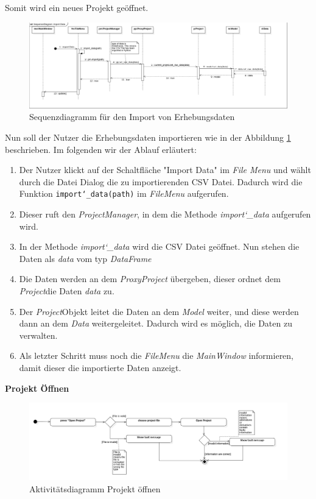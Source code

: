 \documentclass{article}
\begin{document}
Somit wird ein neues Projekt geöffnet.
\begin{figure}[H]%
    \includegraphics[width=15cm]{entwurf/Entwurf_dokument/img/Alissa/SQImportDataFinal.png}
    \caption{Sequenzdiagramm für den Import von Erhebungsdaten}
    \label{fig:sq:importData}
\end{figure}
Nun soll der Nutzer die Erhebungsdaten importieren wie in der Abbildung \ref{fig:sq:importData} beschrieben. Im folgenden wir der Ablauf erläutert:
\begin{enumerate}
    \item[1.] Der Nutzer klickt auf der Schaltfläche "Import Data" im \textit{File Menu} und wählt durch die Datei Dialog die zu importierenden CSV Datei. Dadurch wird die Funktion \texttt{import\char`_data(path)} im \textit{FileMenu} aufgerufen.
    \item[2.] Dieser ruft den \textit{ProjectManager}, in dem die Methode \textit{import\char`_data} aufgerufen wird.
    \item[3.] In der Methode \textit{import\char`_data} wird die CSV Datei geöffnet. Nun stehen die Daten als \textit{data} vom typ \textit{DataFrame}
    \item[4.] Die Daten werden an dem \textit{ProxyProject} übergeben, dieser ordnet dem \textit{Project}\textendash die Daten \textit{data} zu.
    \item[5.] Der \textit{Project}\textendash Objekt leitet die Daten an dem \textit{Model} weiter, und diese werden dann an dem \textit{Data} weitergeleitet. Dadurch wird es möglich, die Daten zu verwalten.
    \item[6.] Als letzter Schritt muss noch die \textit{FileMenu} die \textit{MainWindow} informieren, damit dieser die importierte Daten anzeigt. 
\end{enumerate}
\newpage
\textbf{\large{Projekt Öffnen}}
\begin{figure}[H]%
    \centering
    \includegraphics[width=13cm]{entwurf/Entwurf_dokument/img/Alissa/OpenProjectAD.png}
    \caption{Aktivitätsdiagramm Projekt öffnen}
\end{figure}
\end{document}
